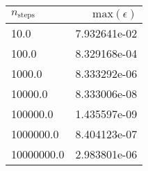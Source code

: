 \begin{tabular}{l|r}
\toprule
 $n_{\mathrm{steps}}$ &  $\mathrm{max}(\epsilon)$ \\
\midrule
                 10.0 &              7.932641e-02 \\
                100.0 &              8.329168e-04 \\
               1000.0 &              8.333292e-06 \\
              10000.0 &              8.333006e-08 \\
             100000.0 &              1.435597e-09 \\
            1000000.0 &              8.404123e-07 \\
           10000000.0 &              2.983801e-06 \\
\bottomrule
\end{tabular}
